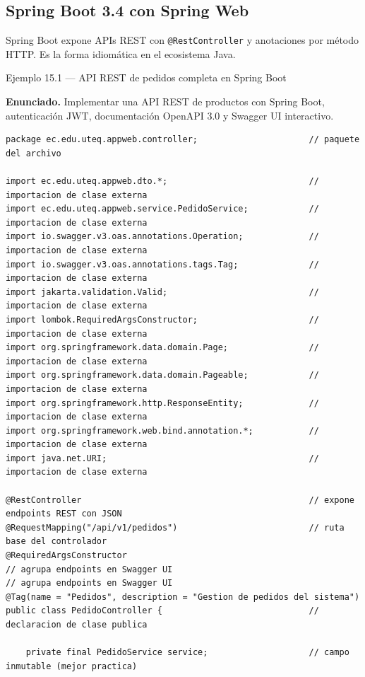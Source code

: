 \documentclass[11pt,a4paper,openany]{book}
\begin{document}
\subsection{Spring Boot 3.4 con Spring Web}

Spring Boot expone APIs REST con \texttt{@RestController} y
anotaciones por método HTTP. Es la forma idiomática en el ecosistema
Java.


\begin{cajaejemplo}{Ejemplo 15.1 --- API REST de pedidos completa en Spring Boot}

\textbf{Enunciado.} Implementar una API REST de productos con Spring Boot, autenticación JWT, documentación OpenAPI 3.0 y Swagger UI interactivo.

\begin{lstlisting}[style=java,caption={PedidoController.java},label=lst:15.2]
package ec.edu.uteq.appweb.controller;                      // paquete del archivo

import ec.edu.uteq.appweb.dto.*;                            // importacion de clase externa
import ec.edu.uteq.appweb.service.PedidoService;            // importacion de clase externa
import io.swagger.v3.oas.annotations.Operation;             // importacion de clase externa
import io.swagger.v3.oas.annotations.tags.Tag;              // importacion de clase externa
import jakarta.validation.Valid;                            // importacion de clase externa
import lombok.RequiredArgsConstructor;                      // importacion de clase externa
import org.springframework.data.domain.Page;                // importacion de clase externa
import org.springframework.data.domain.Pageable;            // importacion de clase externa
import org.springframework.http.ResponseEntity;             // importacion de clase externa
import org.springframework.web.bind.annotation.*;           // importacion de clase externa
import java.net.URI;                                        // importacion de clase externa

@RestController                                             // expone endpoints REST con JSON
@RequestMapping("/api/v1/pedidos")                          // ruta base del controlador
@RequiredArgsConstructor
// agrupa endpoints en Swagger UI
// agrupa endpoints en Swagger UI
@Tag(name = "Pedidos", description = "Gestion de pedidos del sistema")
public class PedidoController {                             // declaracion de clase publica

    private final PedidoService service;                    // campo inmutable (mejor practica)


\end{lstlisting}
\end{cajaejemplo}
\end{document}
